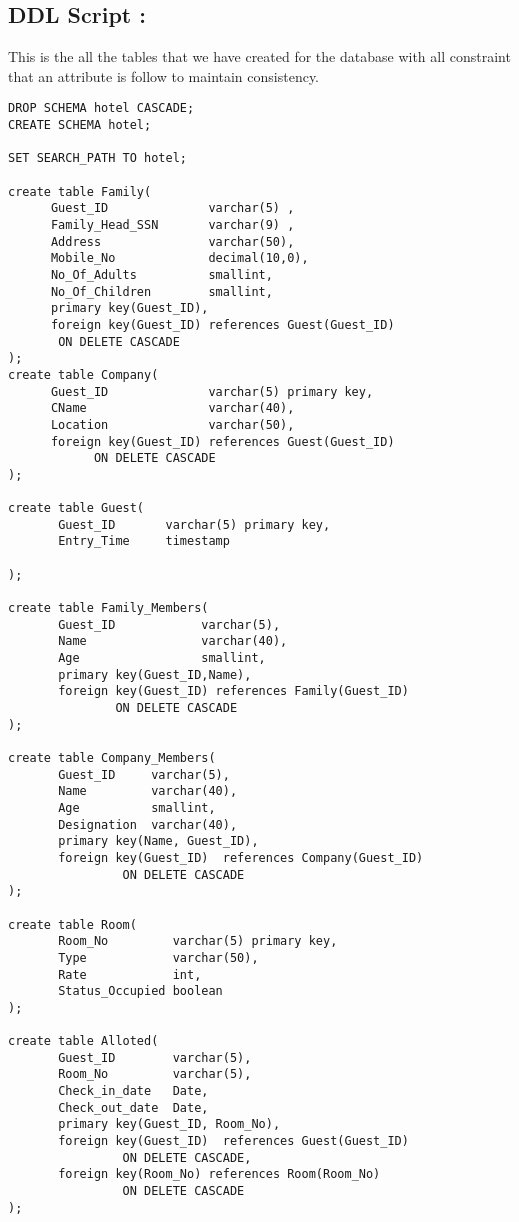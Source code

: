 \documentclass[a4,12pt]{report}
\begin{document}
\subsection*{DDL Script :}
This is the all the tables that we have created for the database with all constraint that an attribute is follow to maintain consistency. 
\begin{lstlisting}
DROP SCHEMA hotel CASCADE;
CREATE SCHEMA hotel;

SET SEARCH_PATH TO hotel;

create table Family(
      Guest_ID          	varchar(5) ,
      Family_Head_SSN   	varchar(9) ,
      Address           	varchar(50),
      Mobile_No          	decimal(10,0),
      No_Of_Adults      	smallint,
      No_Of_Children    	smallint,
      primary key(Guest_ID),
      foreign key(Guest_ID) references Guest(Guest_ID)
       ON DELETE CASCADE
);
create table Company(
      Guest_ID              varchar(5) primary key,
      CName                 varchar(40),
      Location              varchar(50),
      foreign key(Guest_ID) references Guest(Guest_ID)
			ON DELETE CASCADE
);

create table Guest(
       Guest_ID       varchar(5) primary key,
       Entry_Time     timestamp
  
);

create table Family_Members(
       Guest_ID            varchar(5),
       Name                varchar(40),
       Age                 smallint,
       primary key(Guest_ID,Name),
       foreign key(Guest_ID) references Family(Guest_ID)
               ON DELETE CASCADE
);

create table Company_Members(
       Guest_ID     varchar(5),
       Name         varchar(40),
       Age          smallint,
       Designation  varchar(40),
       primary key(Name, Guest_ID),
       foreign key(Guest_ID)  references Company(Guest_ID)
                ON DELETE CASCADE
);

create table Room(
       Room_No         varchar(5) primary key,
       Type            varchar(50),
       Rate            int,
       Status_Occupied boolean
);

create table Alloted(
       Guest_ID        varchar(5),
       Room_No         varchar(5),
       Check_in_date   Date,
       Check_out_date  Date,
       primary key(Guest_ID, Room_No),
       foreign key(Guest_ID)  references Guest(Guest_ID)
                ON DELETE CASCADE,     
       foreign key(Room_No) references Room(Room_No)
                ON DELETE CASCADE
);


\end{lstlisting}
\end{document}
